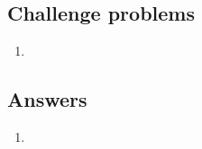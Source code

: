 \subsection{Challenge problems}

\begin{enumerate}[resume]
\item 
\end{enumerate}


\subsection{Answers}

\begin{enumerate}
\item 
\end{enumerate}